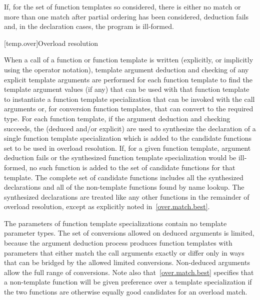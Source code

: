 \pnum
If, for the set of function templates so considered, there is either no match or
more than one match after partial ordering has been considered,
deduction fails and, in the declaration cases, the
program is ill-formed.

[temp.over]{Overload resolution}

\pnum
{}%
When a call of a function or function template
is written (explicitly, or implicitly using the
operator notation), template argument deduction
and checking of any explicit template arguments are performed
for each function template to find the template argument values (if any) that
can be used with that function template to instantiate a function template
specialization that can be invoked with the call arguments or,
for conversion function templates, that can convert to the required type.
For each function template, if the argument deduction and checking succeeds,
the
(deduced and/or explicit)
are used to synthesize the declaration of
a single function template specialization which is
added to the candidate functions set to be used in overload resolution.
If, for a given function template, argument deduction fails or
the synthesized function template specialization would be ill-formed,
no such function is added to the set of candidate functions for that template.
The complete set of candidate functions includes all the synthesized
declarations and all of the non-template functions found by name lookup.
The synthesized declarations are
treated like any other functions in
the remainder of overload resolution, except as explicitly noted
in~\ref{over.match.best}.
\begin{footnote}
The parameters of function template
specializations contain no
template parameter types.
The set of conversions allowed on deduced arguments is limited, because the
argument deduction process produces function templates with parameters that
either match the call arguments exactly or differ only in ways that can be
bridged by the allowed limited conversions.
Non-deduced arguments allow the full range of conversions.
Note also that~\ref{over.match.best} specifies that a non-template function will
be given preference over a template specialization if the two functions
are otherwise equally good candidates for an overload match.
\end{footnote}

